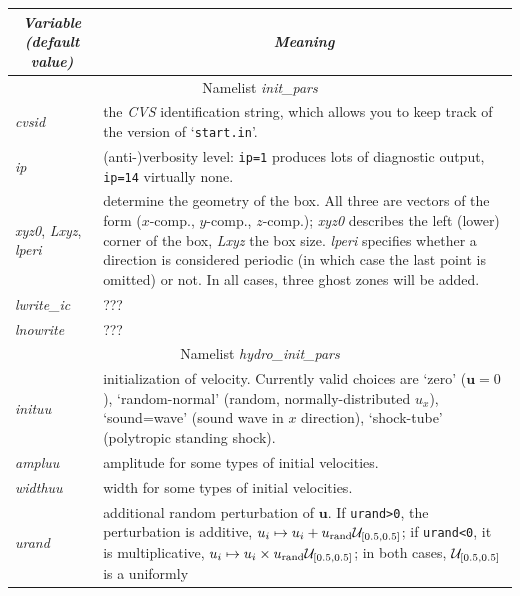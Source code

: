 \documentclass[12pt,twoside,notitlepage,a4paper]{article}
\makeatletter
\newcommand{\code}[1]{\texttt{#1}}
\newcommand{\var}[1]{\textsl{#1}\index{#1@\emph{#1}}\/}
\newcommand{\file}[1]{`\texttt{#1}'}
\newcommand{\name}[1]{\textsl{#1}\index{#1}\/}
\newcommand{\vekt}[1] {\mathbf{#1}}
\newcommand{\uv}            {\vekt{u}}
\makeatother
\begin{document}
\begin{longtable}{lp{}}
\toprule
  \multicolumn{1}{c}{\emph{Variable (default value)}}
               & \multicolumn{1}{c}{\emph{Meaning}} \\
\midrule
  \multicolumn{2}{c}{Namelist \name{init_pars}}\\
\midrule
  \var{cvsid}  & the \name{CVS} identification string, which allows you to
                 keep track of the version of \file{start.in}.\\
  \var{ip}     & (anti-)verbosity level: \code{ip=1} produces lots of
                 diagnostic output, \code{ip=14} virtually none. \\
  \var{xyz0},
  \var{Lxyz},
  \var{lperi}  & determine the geometry of the box. All three are vectors
                 of the form ($x$-comp., $y$-comp., $z$-comp.); \var{xyz0}
                 describes the left (lower) corner of the box, \var{Lxyz}
                 the box size.
                 \var{lperi} specifies whether a direction is considered
                 periodic (in which case the last point is omitted) or not.
                 In all cases, three ghost zones will be added. \\
  \var{lwrite_ic}
               & ??? \\
  \var{lnowrite}
               & ??? \\
%
\midrule
  \multicolumn{2}{c}{Namelist \name{hydro_init_pars}} \\
\midrule
  \var{inituu} & initialization of velocity. Currently valid choices are
                 `zero' ($\uv=0$), 
                 `random-normal' (random, normally-distributed $u_x$), 
                 `sound=wave' (sound wave in $x$ direction), 
                 `shock-tube' (polytropic standing shock). \\
  \var{ampluu} & amplitude for some types of initial velocities. \\
  \var{widthuu}& width for some types of initial velocities. \\
  \var{urand}  & additional random perturbation of $\uv$. If
                 \verb|urand>0|, the perturbation is additive,
                 $u_i \mapsto u_i + u_{\rm rand}{\cal U}_{[0.5,0.5]}$;
                 if \verb|urand<0|, it is multiplicative,
                 $u_i \mapsto u_i \times u_{\rm rand}{\cal U}_{[0.5,0.5]}$;
                 in both cases, ${\cal U}_{[0.5,0.5]}$ is a uniformly

\end{longtable}
\end{document}
